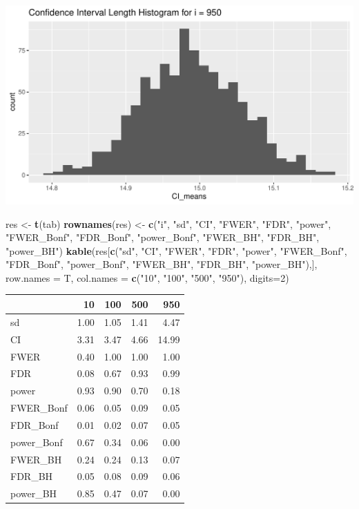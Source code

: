 \documentclass[
]{article}
\newenvironment{Shaded}{\begin{snugshade}}{\end{snugshade}}
\newcommand{\DataTypeTok}[1]{\textcolor[rgb]{0.13,0.29,0.53}{#1}}
\newcommand{\DecValTok}[1]{\textcolor[rgb]{0.00,0.00,0.81}{#1}}
\newcommand{\KeywordTok}[1]{\textcolor[rgb]{0.13,0.29,0.53}{\textbf{#1}}}
\newcommand{\NormalTok}[1]{#1}
\newcommand{\StringTok}[1]{\textcolor[rgb]{0.31,0.60,0.02}{#1}}
\begin{document}
\includegraphics{report_files/figure-latex/task_2-8.pdf}

\begin{Shaded}
\begin{Highlighting}[]
\NormalTok{res <-}\StringTok{  }\KeywordTok{t}\NormalTok{(tab)}
\KeywordTok{rownames}\NormalTok{(res) <-}\StringTok{ }\KeywordTok{c}\NormalTok{(}\StringTok{"i"}\NormalTok{, }\StringTok{"sd"}\NormalTok{, }\StringTok{"CI"}\NormalTok{, }\StringTok{"FWER"}\NormalTok{,  }\StringTok{"FDR"}\NormalTok{, }\StringTok{"power"}\NormalTok{, }\StringTok{"FWER_Bonf"}\NormalTok{, }
                   \StringTok{"FDR_Bonf"}\NormalTok{, }\StringTok{"power_Bonf"}\NormalTok{,  }\StringTok{"FWER_BH"}\NormalTok{, }\StringTok{"FDR_BH"}\NormalTok{, }\StringTok{"power_BH"}\NormalTok{)}
\KeywordTok{kable}\NormalTok{(res[}\KeywordTok{c}\NormalTok{(}\StringTok{"sd"}\NormalTok{, }\StringTok{"CI"}\NormalTok{, }\StringTok{"FWER"}\NormalTok{,  }\StringTok{"FDR"}\NormalTok{, }\StringTok{"power"}\NormalTok{, }\StringTok{"FWER_Bonf"}\NormalTok{, }\StringTok{"FDR_Bonf"}\NormalTok{, }
            \StringTok{"power_Bonf"}\NormalTok{,  }\StringTok{"FWER_BH"}\NormalTok{, }\StringTok{"FDR_BH"}\NormalTok{, }\StringTok{"power_BH"}\NormalTok{),], }
      \DataTypeTok{row.names =}\NormalTok{ T, }\DataTypeTok{col.names =} \KeywordTok{c}\NormalTok{(}\StringTok{"10"}\NormalTok{, }\StringTok{"100"}\NormalTok{, }\StringTok{"500"}\NormalTok{, }\StringTok{"950"}\NormalTok{), }\DataTypeTok{digits=}\DecValTok{2}\NormalTok{)}
\end{Highlighting}
\end{Shaded}

\begin{longtable}[]{@{}lrrrr@{}}
\toprule
& 10 & 100 & 500 & 950\tabularnewline
\midrule
\endhead
sd & 1.00 & 1.05 & 1.41 & 4.47\tabularnewline
CI & 3.31 & 3.47 & 4.66 & 14.99\tabularnewline
FWER & 0.40 & 1.00 & 1.00 & 1.00\tabularnewline
FDR & 0.08 & 0.67 & 0.93 & 0.99\tabularnewline
power & 0.93 & 0.90 & 0.70 & 0.18\tabularnewline
FWER\_Bonf & 0.06 & 0.05 & 0.09 & 0.05\tabularnewline
FDR\_Bonf & 0.01 & 0.02 & 0.07 & 0.05\tabularnewline
power\_Bonf & 0.67 & 0.34 & 0.06 & 0.00\tabularnewline
FWER\_BH & 0.24 & 0.24 & 0.13 & 0.07\tabularnewline
FDR\_BH & 0.05 & 0.08 & 0.09 & 0.06\tabularnewline
power\_BH & 0.85 & 0.47 & 0.07 & 0.00\tabularnewline
\bottomrule
\end{longtable}
\end{document}
